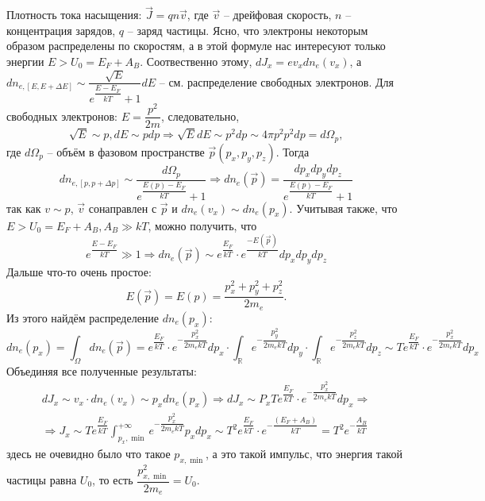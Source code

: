 Плотность тока насыщения: $\vec{J} = q n \vec{v}$, где $\vec{v}$ -- дрейфовая скорость, 
$n$ -- концентрация зарядов, $q$ -- заряд частицы. Ясно, что электроны некоторым образом
распределены по скоростям, а в этой формуле нас интересуют только энергии
$E > U_0 = E_F + A_B$. Соотвественно этому, $d J_x = e v_x dn_e (v_x)$, а
$dn_{e, [E, E+\Delta E]} \sim \dfrac{\sqrt{E}}{e^{\dfrac{E-E_F}{kT}} + 1} dE$ -- см.
распределение свободных электронов. Для свободных электронов: $E = \dfrac{p^2}{2m}$,
следовательно,
\[
  \sqrt{E} \sim p, dE \sim p dp \Rightarrow \sqrt{E} dE \sim p^2 dp \sim 4\pi p^2 p^2 dp = d \Omega_p,
\]
где $d\Omega_p$ -- объём в фазовом пространстве $\vec{p} (p_x, p_y, p_z)$. Тогда
\[
  dn_{e, [p, p+\Delta p]} \sim \dfrac{d\Omega_p}{e^{\dfrac{E(p) - E_F}{kT}} + 1}
\Rightarrow
  dn_e (\vec{p}) = \dfrac{dp_x dp_y dp_z}{e^{\dfrac{E(p) - E_F}{kT}} + 1}
\]
так как $v \sim p$, $\vec{v}$ сонаправлен с $\vec{p}$ и $dn_e (v_x) \sim dn_e(p_x)$.
Учитывая также, что $E > U_0 = E_F + A_B, A_B \gg kT$, можно получить, что 
\[
  e^{\dfrac{E-E_F}{kT}} \gg 1
  \Rightarrow
  dn_e (\vec{p}) \sim e^{\dfrac{E_F}{kT}} \cdot e^{\dfrac{- E(\vec{p})}{kT}} dp_x dp_y dp_z
\]
Дальше что-то очень простое:
\[
  E(\vec{p}) = E(p) = \dfrac{p_x^2 + p_y^2 + p_z^2}{2m_e}.
\]
Из этого найдём распределение $dn_e (p_x)$:
\[
  dn_e (p_x) = \int_\Omega dn_e (\vec{p}) = e^{\dfrac{E_F}{kT}} \cdot 
  e^{- \dfrac{p_x^2}{2m_e kT}} dp_x \cdot 
  \int_\mathbb{R} e^{- \dfrac{p_y^2}{2m_e kT}} dp_y \cdot 
  \int_\mathbb{R} e^{- \dfrac{p_z^2}{2m_e kT}} dp_z
  \sim T e^{\dfrac{E_F}{kT}} \cdot e^{-\dfrac{p_x^2}{2m_e kT}} dp_x
\]
Объединяя все полученные результаты:
\begin{multline*}
  dJ_x \sim v_x \cdot dn_e (v_x) \sim p_x dn_e (p_x)
  \Rightarrow
  dJ_x \sim P_x T e^{\dfrac{E_F}{kT}} \cdot e^{-\dfrac{p_x^2}{2m_e kT}} dp_x
  \Rightarrow \\
  \Rightarrow
  J_x \sim T e^{\dfrac{E_F}{kT}} \int_{p_x, \min}^{+\infty} e^{-\dfrac{p_x^2}{2m_e kT}} p_x dp_x
  \sim T^2 e^{\dfrac{E_F}{kT}} \cdot e^{-\dfrac{(E_F + A_B)}{kT}}
  = T^2 e^{- \dfrac{A_B}{kT}}
\end{multline*}
здесь не очевидно было что такое $p_{x, \min}$, а это такой импульс, что энергия такой частицы
равна $U_0$, то есть $\dfrac{p_{x, \min}^2}{2m_e} = U_0$.
